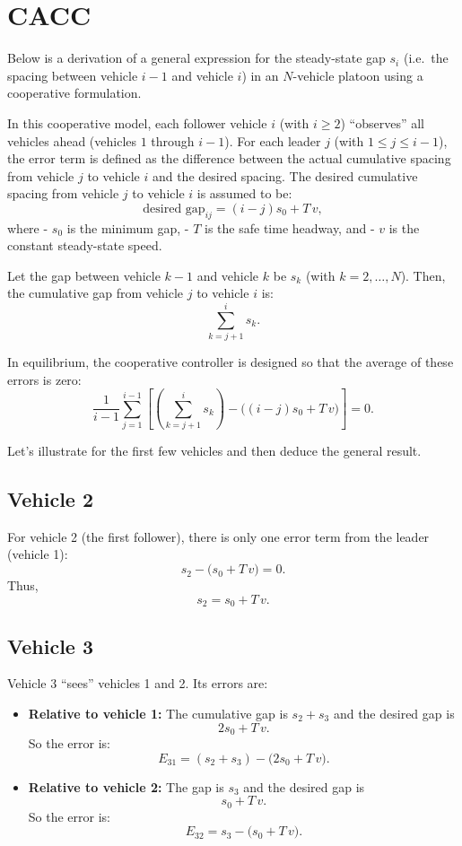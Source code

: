 \documentclass{article}
\begin{document}
\section{CACC}

Below is a derivation of a general expression for the steady-state gap \( s_i \) (i.e.\ the spacing between vehicle \( i-1 \) and vehicle \( i \)) in an \(N\)-vehicle platoon using a cooperative formulation.

In this cooperative model, each follower vehicle \( i \) (with \( i \ge 2 \)) ``observes'' all vehicles ahead (vehicles \( 1 \) through \( i-1 \)). For each leader \( j \) (with \( 1 \le j \le i-1 \)), the error term is defined as the difference between the actual cumulative spacing from vehicle \( j \) to vehicle \( i \) and the desired spacing. The desired cumulative spacing from vehicle \( j \) to vehicle \( i \) is assumed to be:
\[
\text{desired gap}_{ij} = (i-j) s_0 + T\,v,
\]
where  
- \( s_0 \) is the minimum gap,  
- \( T \) is the safe time headway, and  
- \( v \) is the constant steady-state speed.

Let the gap between vehicle \( k-1 \) and vehicle \( k \) be \( s_k \) (with \( k=2,\ldots,N \)). Then, the cumulative gap from vehicle \( j \) to vehicle \( i \) is:
\[
\sum_{k=j+1}^{i} s_k.
\]

In equilibrium, the cooperative controller is designed so that the average of these errors is zero:
\[
\frac{1}{i-1}\sum_{j=1}^{i-1}\left[\left(\sum_{k=j+1}^{i} s_k\right) - \Big((i-j)s_0 + T\,v\Big)\right] = 0.
\]

Let's illustrate for the first few vehicles and then deduce the general result.

\subsection*{Vehicle 2}

For vehicle 2 (the first follower), there is only one error term from the leader (vehicle 1):
\[
s_2 - \Big(s_0 + T\,v\Big) = 0.
\]
Thus,
\[
s_2 = s_0 + T\,v.
\]

\subsection*{Vehicle 3}

Vehicle 3 ``sees'' vehicles 1 and 2. Its errors are:
\begin{itemize}
    \item \textbf{Relative to vehicle 1:}  
    The cumulative gap is \( s_2 + s_3 \) and the desired gap is  
    \[
    2s_0 + T\,v.
    \]
    So the error is:
    \[
    E_{31} = (s_2+s_3) - \Big(2s_0 + T\,v\Big).
    \]
    \item \textbf{Relative to vehicle 2:}  
    The gap is \( s_3 \) and the desired gap is
    \[
    s_0 + T\,v.
    \]
    So the error is:
    \[
    E_{32} = s_3 - \Big(s_0 + T\,v\Big).
    \]
\end{itemize}
\end{document}

